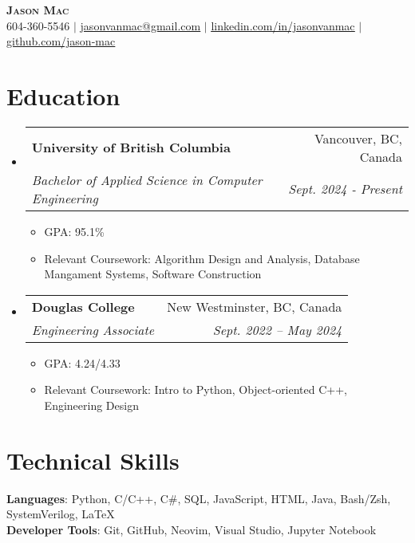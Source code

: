 \documentclass[letterpaper,11pt]{article}
\makeatletter
\newcommand{\resumeItem}[1]{
  \item\small{
    {#1 \vspace{-2pt}}
  }
}
\newcommand{\resumeSubheading}[4]{
  \vspace{-2pt}\item
    \begin{tabular*}{0.97\textwidth}[t]{l@{\extracolsep{\fill}}r}
      \textbf{#1} & #2 \\
      \textit{\small#3} & \textit{\small #4} \\
    \end{tabular*}\vspace{-7pt}
}
\newcommand{\resumeSubHeadingListStart}{\begin{itemize}[leftmargin=0.15in, label={}]}
\newcommand{\resumeSubHeadingListEnd}{\end{itemize}}
\newcommand{\resumeItemListStart}{\begin{itemize}}
\newcommand{\resumeItemListEnd}{\end{itemize}\vspace{-5pt}}
\makeatother
\begin{document}

\begin{center}
	\textbf{\Huge \scshape Jason Mac} \\ \vspace{1pt}
	\small 604-360-5546 $|$ \href{jasonvanmac:@gmail.com}{\underline{jasonvanmac@gmail.com}} $|$
	\href{https://www.linkedin.com/in/jasonvanmac}{\underline{linkedin.com/in/jasonvanmac}} $|$
	\href{https://github.com/jason-mac}{\underline{github.com/jason-mac}}
\end{center}


\section{Education}
\resumeSubHeadingListStart
\resumeSubheading
{University of British Columbia}{Vancouver, BC, Canada}
{Bachelor of Applied Science in Computer Engineering}{Sept. 2024 - Present}
\resumeItemListStart
\resumeItem{GPA: 95.1\%}
\resumeItem{Relevant Coursework: Algorithm Design and Analysis, Database Mangament Systems, Software Construction}
\resumeItemListEnd

\resumeSubheading
{Douglas College}{New Westminster, BC, Canada}
{Engineering Associate}{Sept. 2022 -- May 2024}
\resumeItemListStart
\resumeItem{GPA: 4.24/4.33}
\resumeItem{Relevant Coursework: Intro to Python, Object-oriented C++, Engineering Design}
\resumeItemListEnd
\resumeSubHeadingListEnd


\section{Technical Skills}
\begin{itemize}[leftmargin=0.15in, label={}]
	\small{\item{
	      \textbf{Languages}{: Python, C/C++, C\#, SQL, JavaScript, HTML, Java, Bash/Zsh, SystemVerilog, LaTeX} \\
	      \textbf{Developer Tools}{: Git, GitHub, Neovim, Visual Studio, Jupyter Notebook} \\
	      }}
\end{itemize}
\end{document}
